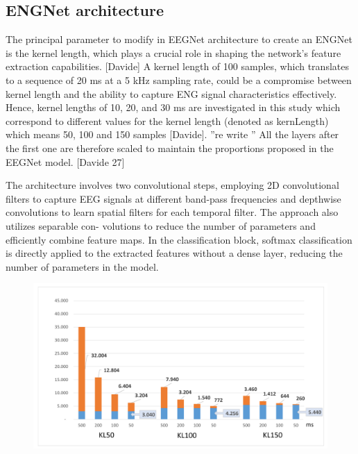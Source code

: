 \documentclass{Configuration_Files/PoliMi3i_thesis}
\begin{document}
\subsection{ENGNet architecture}

The principal parameter to modify in EEGNet architecture to create an ENGNet is the kernel length, which plays a crucial role in shaping the network’s feature extraction capabilities. [Davide]
A kernel length of 100 samples, which translates to a sequence of 20 ms at a 5 kHz sampling rate, could be a compromise between kernel length and the ability to capture ENG signal characteristics effectively. Hence, kernel lengths of 10, 20, and 30 ms are investigated in this study which correspond to different values for the kernel length (denoted as kernLength) which means 50, 100 and 150 samples [Davide].
''re write ''
All the layers after the first one are therefore scaled to maintain the proportions proposed in the EEGNet model. [Davide 27]



The architecture involves two convolutional steps, employing 2D convolutional filters to capture EEG signals at different band-pass frequencies and depthwise convolutions to learn spatial filters for each temporal filter. The approach also utilizes separable con- volutions to reduce the number of parameters and efficiently combine feature maps. In the classification block, softmax classification is directly applied to the extracted features without a dense layer, reducing the number of parameters in the model.


\begin{figure}[H]
	\includegraphics[scale=0.3]{engNet_params.png}
	\centering
\end{figure}
\end{document}
